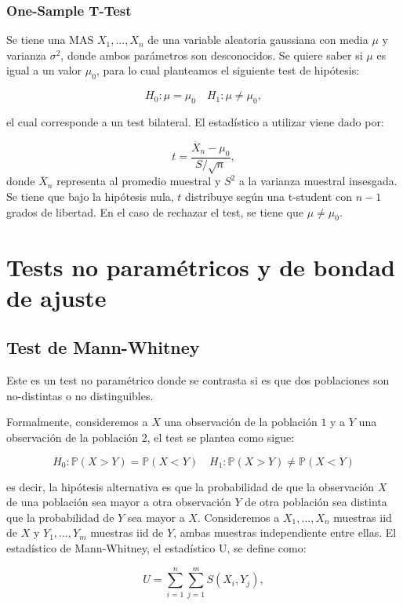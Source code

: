 \subsubsection{One-Sample T-Test}

Se tiene una MAS $X_1,...,X_n$ de una variable aleatoria gaussiana con media $\mu$ y varianza $\sigma^2$, donde ambos parámetros son desconocidos. Se quiere saber si $\mu$ es igual a un valor $\mu_0$, para lo cual planteamos el siguiente test de hipótesis:

$$
H_0:\mu= \mu_0 \quad H_1:\mu\neq \mu_0,
$$

el cual corresponde a un test bilateral. El estadístico a utilizar viene dado por:

\[t=\dfrac{\overline{X}_n-\mu_0}{S/\sqrt{n}},\]
donde $\overline{X}_n$ representa al promedio muestral y $S^2$ a la varianza muestral insesgada. Se tiene que bajo la hipótesis nula, $t$ distribuye según una t-student con $n-1$ grados de libertad. En el caso de rechazar el test, se tiene que $\mu\neq \mu_0$. 



\section{Tests no paramétricos y de bondad de ajuste}

\subsection{Test de Mann-Whitney}

Este es un test no paramétrico donde se contrasta si es que dos poblaciones son no-distintas o no distinguibles.

Formalmente, consideremos a $X$ una observación de la población $1$ y a $Y$ una observación de la población $2$, el test se plantea como sigue:

$$
H_0:\mathbb{P}(X>Y)=\mathbb{P}(X<Y) \quad H_1:\mathbb{P}(X>Y)\neq\mathbb{P}(X<Y)
$$

es decir, la hipótesis alternativa es que la probabilidad de que la observación $X$ de una población sea mayor a otra observación $Y$ de otra población sea distinta que la probabilidad de $Y$ sea mayor a $X$. Consideremos a $X_1,...,X_n$ muestras iid de $X$ y $Y_1,...,Y_m$ muestras iid de $Y$, ambas muestras independiente entre ellas. El estadístico de Mann-Whitney, el estadístico U, se define como:

$$
U=\sum\limits_{i=1}^n\sum\limits_{j=1}^mS(X_i, Y_j),
$$

